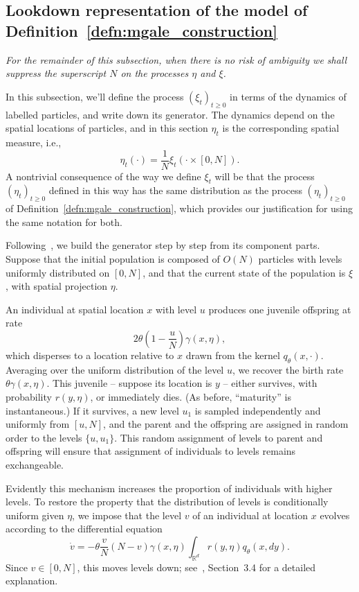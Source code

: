 \documentclass[EJP]{ejpecp} %
\newcommand{\IR}{\mathbb R}
\newcommand{\lp}{\xi}              %
\begin{document}
\subsection{Lookdown representation of the model of 
Definition~\ref{defn:mgale_construction}}
\label{sec:lookdown_defn}


{\em For the remainder of this subsection, when there is no risk of ambiguity we shall
suppress the superscript $N$ on the processes $\eta$ and $\xi$.}

In this subsection,
we'll define the process $(\lp_t)_{t \ge 0}$ in terms of the 
dynamics of labelled particles,
and write down its generator.
The dynamics depend on the spatial locations of particles,
and in this section $\eta_t$ is the corresponding spatial measure,
i.e.,
$$
    \eta_t(\cdot) = \frac{1}{N} \lp_t(\cdot \times [0, N])  .
$$
A nontrivial consequence of the way we define $\lp_t$ will be that
the process $(\eta_t)_{t \ge 0}$ defined in this way 
has the same distribution as the process $(\eta_t)_{t \ge 0}$ 
of Definition~\ref{defn:mgale_construction},
which provides our justification for using the same notation for both.


Following~\cite{etheridge/kurtz:2019}, we build the generator step by step
from its 
component parts. 
Suppose that the initial population is composed of $O(N)$ particles
with levels uniformly distributed on $[0, N]$,
and that the current state of the population is $\lp$,
with spatial projection $\eta$.

An individual at spatial location $x$ with level $u$
produces one juvenile offspring at rate 
$$
2 \theta \left(1 - \frac{u}{N}\right) \gamma(x, \eta) ,
$$
which disperses to a location relative to $x$ drawn 
from the kernel $q_{\theta}(x, \cdot)$.
Averaging over the uniform distribution of the level $u$,
we recover the birth rate $\theta\gamma(x, \eta)$.
This juvenile -- suppose its location is $y$ --
either survives, with probability $r(y, \eta)$, or immediately dies.
(As before, ``maturity'' is instantaneous.)
If it survives, 
a new level $u_1$ is sampled independently and uniformly from $[u,N]$,
and the parent and the offspring are assigned in random order to the 
levels $\{u, u_1\}$.
This random assignment of levels to parent
and offspring will ensure that assignment of individuals to levels remains exchangeable.

Evidently this mechanism increases the proportion
of individuals with higher levels.
To restore the property that
the distribution of levels is conditionally uniform
given $\eta$,
we impose that 
the level $v$ of an individual at location $x$
evolves according to the differential equation
$$
    \dot{v}
    =
    -\theta \frac{v}{N} \left(N - v\right)
    \gamma(x, \eta) \int_{\IR^d} r(y, \eta) q_\theta(x, dy) .
$$
Since $v \in [0, N]$, this moves levels down;
see~\cite{etheridge/kurtz:2019}, Section~3.4 for a detailed explanation.
\end{document}
